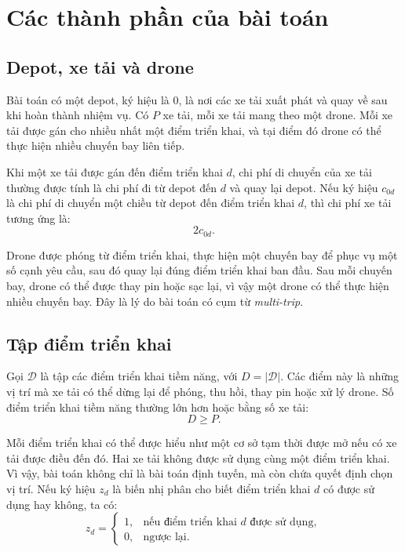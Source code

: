 \section{Các thành phần của bài toán}

\subsection{Depot, xe tải và drone}

Bài toán có một depot, ký hiệu là $0$, là nơi các xe tải xuất phát và quay về sau khi hoàn thành nhiệm vụ. Có $P$ xe tải, mỗi xe tải mang theo một drone. Mỗi xe tải được gán cho nhiều nhất một điểm triển khai, và tại điểm đó drone có thể thực hiện nhiều chuyến bay liên tiếp.

Khi một xe tải được gán đến điểm triển khai $d$, chi phí di chuyển của xe tải thường được tính là chi phí đi từ depot đến $d$ và quay lại depot. Nếu ký hiệu $c_{0d}$ là chi phí di chuyển một chiều từ depot đến điểm triển khai $d$, thì chi phí xe tải tương ứng là:
\begin{equation}
2c_{0d}.
\end{equation}

Drone được phóng từ điểm triển khai, thực hiện một chuyến bay để phục vụ một số cạnh yêu cầu, sau đó quay lại đúng điểm triển khai ban đầu. Sau mỗi chuyến bay, drone có thể được thay pin hoặc sạc lại, vì vậy một drone có thể thực hiện nhiều chuyến bay. Đây là lý do bài toán có cụm từ \textit{multi-trip}.

\subsection{Tập điểm triển khai}

Gọi $\mathcal{D}$ là tập các điểm triển khai tiềm năng, với $D = |\mathcal{D}|$. Các điểm này là những vị trí mà xe tải có thể dừng lại để phóng, thu hồi, thay pin hoặc xử lý drone. Số điểm triển khai tiềm năng thường lớn hơn hoặc bằng số xe tải:
\begin{equation}
D \geq P.
\end{equation}

Mỗi điểm triển khai có thể được hiểu như một cơ sở tạm thời được mở nếu có xe tải được điều đến đó. Hai xe tải không được sử dụng cùng một điểm triển khai. Vì vậy, bài toán không chỉ là bài toán định tuyến, mà còn chứa quyết định chọn vị trí. Nếu ký hiệu $z_d$ là biến nhị phân cho biết điểm triển khai $d$ có được sử dụng hay không, ta có:
\begin{equation}
z_d =
\begin{cases}
1, & \text{nếu điểm triển khai } d \text{ được sử dụng},\\
0, & \text{ngược lại}.
\end{cases}
\end{equation}

